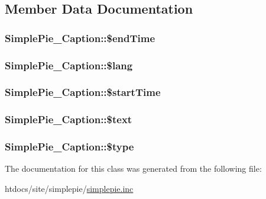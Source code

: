\subsection{Member Data Documentation}
\hypertarget{class_simple_pie___caption_a9d16511397036c304ccda64245c599f8}{
\subsubsection[{\$end\-Time}]{\setlength{\rightskip}{0pt plus 5cm}Simple\-Pie\-\_\-\-Caption\-::\$end\-Time}}\label{class_simple_pie___caption_a9d16511397036c304ccda64245c599f8}
\hypertarget{class_simple_pie___caption_aa5be61a0b9573aab30c5b3d65028a3f4}{
\subsubsection[{\$lang}]{\setlength{\rightskip}{0pt plus 5cm}Simple\-Pie\-\_\-\-Caption\-::\$lang}}\label{class_simple_pie___caption_aa5be61a0b9573aab30c5b3d65028a3f4}
\hypertarget{class_simple_pie___caption_ab7c0b93c95df50e39e5ebb9e774dc5fa}{
\subsubsection[{\$start\-Time}]{\setlength{\rightskip}{0pt plus 5cm}Simple\-Pie\-\_\-\-Caption\-::\$start\-Time}}\label{class_simple_pie___caption_ab7c0b93c95df50e39e5ebb9e774dc5fa}
\hypertarget{class_simple_pie___caption_a4e59cf6625f8dba2e4ce7aed97018861}{
\subsubsection[{\$text}]{\setlength{\rightskip}{0pt plus 5cm}Simple\-Pie\-\_\-\-Caption\-::\$text}}\label{class_simple_pie___caption_a4e59cf6625f8dba2e4ce7aed97018861}
\hypertarget{class_simple_pie___caption_aa53512dffe2b16d1870968db81b3c350}{
\subsubsection[{\$type}]{\setlength{\rightskip}{0pt plus 5cm}Simple\-Pie\-\_\-\-Caption\-::\$type}}\label{class_simple_pie___caption_aa53512dffe2b16d1870968db81b3c350}


The documentation for this class was generated from the following file\-:\begin{DoxyCompactItemize}
\item 
htdocs/site/simplepie/\hyperlink{simplepie_8inc}{simplepie.\-inc}\end{DoxyCompactItemize}
